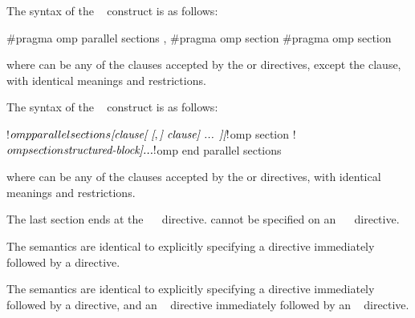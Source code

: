 \syntax
\begin{ccppspecific}
The syntax of the ~ construct is as follows:

\begin{ompcPragma}
#pragma omp parallel sections \plc{[clause[ [},\plc{] clause] ... ] new-line}
    {
    \plc{[}#pragma omp section \plc{new-line]}
    \plc{[}#pragma omp section 
        \plc{structured-block]}
    }
\end{ompcPragma}

where  can be any of the clauses accepted by the  
or  directives, except the  clause, with identical 
meanings and restrictions.
\end{ccppspecific}

\begin{fortranspecific}
The syntax of the ~ construct is as follows:

\begin{ompfPragma}
!$omp parallel sections \plc{[clause[ [},\plc{] clause] ... ]}
    \plc{[}!$omp section\plc{]}
    \plc{[}!$omp section
        \plc{structured-block]}
    \plc{...}
!$omp end parallel sections
\end{ompfPragma}

where  can be any of the clauses accepted by the  
or  directives, with identical meanings and restrictions.

The last section ends at the ~~ directive. 
 cannot be specified on an ~~ 
directive.
\end{fortranspecific}

\descr
\begin{ccppspecific}
The semantics are identical to explicitly specifying a  directive 
immediately followed by a  directive.
\end{ccppspecific}

\begin{fortranspecific}
The semantics are identical to explicitly specifying a  directive 
immediately followed by a  directive, and an ~
directive immediately followed by an ~ directive.
\end{fortranspecific}

